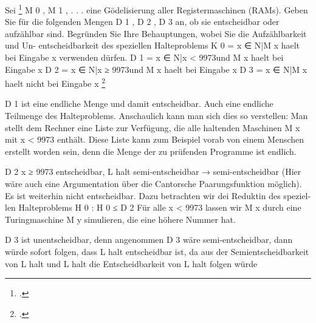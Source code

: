 \documentclass{bschlangaul-aufgabe}
\begin{document}

Sei \footcite{examen:66115:2015:03} M 0 , M 1 , .
. . eine Gödelisierung aller Registermaschinen (RAMs). Geben Sie für die
folgenden Mengen D 1 , D 2 , D 3 an, ob sie entscheidbar oder aufzählbar
sind. Begründen Sie Ihre Behauptungen, wobei Sie die Aufzählbarkeit und
Un- entscheidbarkeit des speziellen Halteproblems K 0 = {x ∈ N|M x haelt
bei Eingabe x} verwenden dürfen. D 1 = {x ∈ N|x < 9973und M x haelt bei
Eingabe x} D 2 = {x ∈ N|x ≥ 9973und M x haelt bei Eingabe x} D 3 = {x ∈
N|M x haelt nicht bei Eingabe x}
\footcite[Aufgabe 6]{theo:ab:4}

\begin{bAntwort}
D 1 ist eine endliche Menge und damit entscheidbar. Auch eine endliche
Teilmenge des Halteproblems. Anschaulich kann man sich dies so
verstellen: Man stellt dem Rechner eine Liste zur Verfügung, die alle
haltenden Maschinen M x mit x < 9973 enthält. Diese Liste kann zum
Beispiel vorab von einem Menschen erstellt worden sein, denn die Menge
der zu prüfenden Programme ist endlich.

D 2 x ≥ 9973 entscheidbar, L halt semi-entscheidbar → semi-entscheidbar
(Hier wäre auch eine Argumentation über die Cantorsche Paarungsfunktion
möglich). Es ist weiterhin nicht entscheidbar. Dazu betrachten wir dei
Reduktin des speziel- len Halteproblems H 0 : H 0 ≤ D 2 Für alle x <
9973 lassen wir M x durch eine Turingmaschine M y simulieren, die eine
höhere Nummer hat.

D 3 ist unentscheidbar, denn angenommen D 3 wäre semi-entscheidbar, dann
würde sofort folgen, dass L halt entscheidbar ist, da aus der
Semientscheidbarkeit von L halt und L halt die Entscheidbarkeit von L
halt folgen würde
\end{bAntwort}
\end{document}
